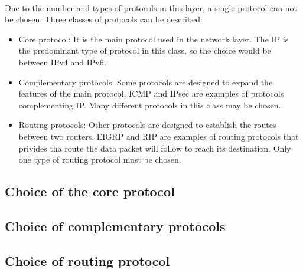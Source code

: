 \documentclass[12pt,a4paper]{report}
\begin{document}
\paragraph{}Due to the number and types of protocols in this layer, a single protocol can not be chosen. Three classes of protocols can be described:
\begin{itemize}
	\item Core protocol: It is the main protocol used in the network layer. The IP is the predominant type of protocol in this class, so the choice would be between IPv4 and IPv6.
	\item Complementary protocols: Some protocols are designed to expand the features of the main protocol. ICMP and IPsec are examples of protocols complementing IP. Many different protocols in this class may be chosen.
	\item Routing protocols: Other protocols are designed to establish the routes between two routers. EIGRP and RIP are examples of routing protocols that privides tha route the data packet will follow to reach its destination. Only one type of routing protocol must be chosen.
\end{itemize}

\subsection{Choice of the core protocol}

\subsection{Choice of complementary protocols}

\subsection{Choice of routing protocol}
\end{document}
